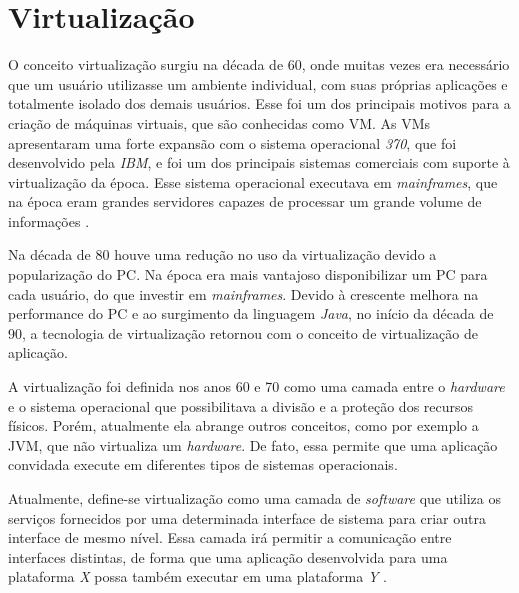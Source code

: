 \chapter{Virtualização}
\label{cap:virtualizacao}

O conceito virtualização surgiu na década de 60, onde muitas vezes era necessário que um usuário utilizasse um ambiente individual, 
com suas próprias aplicações e totalmente isolado dos demais usuários. Esse foi um dos principais motivos para a criação de máquinas 
virtuais, que são conhecidas como \ac{VM}. As \ac{VM}s apresentaram uma forte expansão com o sistema operacional \textit{370}, que foi 
desenvolvido pela \textit{IBM}, e foi um dos principais sistemas comerciais com suporte à virtualização da época. Esse sistema operacional 
executava em \textit{mainframes}, que na época eram grandes servidores capazes de processar um grande volume de informações \cite{laureano2008}. 

Na década de 80 houve uma redução no uso da virtualização devido a popularização do \ac{PC}. Na época era mais vantajoso disponibilizar 
um \ac{PC} para cada usuário, do que investir em \textit{mainframes}. Devido à crescente melhora na performance do \ac{PC} e
ao surgimento da linguagem \textit{Java}, no início da década de 90, a tecnologia de virtualização retornou com o conceito de virtualização
de aplicação.

A virtualização foi definida nos anos 60 e 70 como uma camada entre o \textit{hardware} e o sistema operacional que possibilitava a 
divisão e a proteção dos recursos físicos. Porém, atualmente ela abrange outros conceitos, como por exemplo a \ac{JVM}, que não virtualiza
um \textit{hardware}. De fato, essa permite que uma aplicação convidada execute em diferentes tipos de sistemas operacionais.

Atualmente, define-se virtualização como uma camada de \textit{software} que utiliza os serviços fornecidos por uma determinada interface de 
sistema para criar outra interface de mesmo nível. Essa camada irá permitir a comunicação entre interfaces distintas, de forma que uma 
aplicação desenvolvida para uma plataforma \textit{X} possa também executar em uma plataforma \textit{Y} \cite{laureano2008}.

